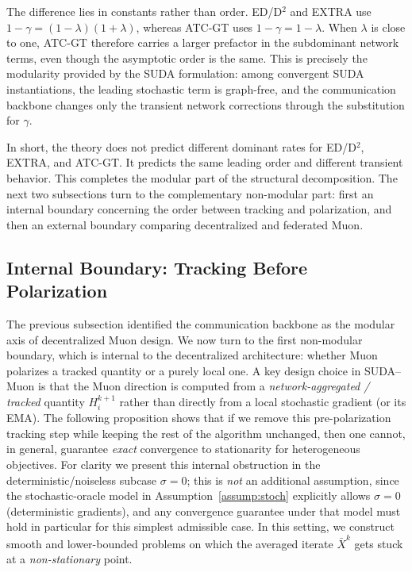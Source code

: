 \documentclass{article}
\newcommand{\sudamuon}{SUDA--Muon}
\begin{document}
The difference lies in constants rather than order. ED/D$^2$ and EXTRA use
$1-\gamma=(1-\lambda)(1+\lambda)$, whereas ATC-GT uses $1-\gamma=1-\lambda$.
When $\lambda$ is close to one, ATC-GT therefore carries a larger prefactor
in the subdominant network terms, even though the asymptotic order is the
same. This is precisely the modularity provided by the SUDA formulation:
among convergent SUDA instantiations, the leading stochastic term is graph-free,
and the communication backbone changes only the transient network corrections
through the substitution for $\gamma$.



In short, the theory does not predict different dominant rates for ED/D$^2$,
EXTRA, and ATC-GT. It predicts the same leading order and different transient
behavior. This completes the modular part of the structural decomposition. The
next two subsections turn to the complementary non-modular part: first an
internal boundary concerning the order between tracking and polarization, and
then an external boundary comparing decentralized and federated Muon.



\subsection{Internal Boundary: Tracking Before Polarization}\label{sec:necessity}

The previous subsection identified the communication backbone as the modular
axis of decentralized Muon design. We now turn to the first non-modular
boundary, which is internal to the decentralized architecture: whether Muon
polarizes a tracked quantity or a purely local one. A key design choice in \sudamuon{} is that the Muon direction is computed from a
\emph{network-aggregated / tracked} quantity $H_i^{k+1}$ rather than directly from a
local stochastic gradient (or its EMA). The following proposition shows that if we
remove this pre-polarization tracking step while keeping the rest of the algorithm
unchanged, then one cannot, in general, guarantee \emph{exact} convergence to
stationarity for heterogeneous objectives. For clarity we present this internal obstruction in
the deterministic/noiseless subcase $\sigma=0$; this is \emph{not} an additional
assumption, since the stochastic-oracle model in Assumption~\ref{assump:stoch}
explicitly allows $\sigma=0$ (deterministic gradients), and any convergence guarantee
under that model must hold in particular for this simplest admissible case. In this
setting, we construct smooth and lower-bounded problems on which the averaged iterate
$\bar X^k$ gets stuck at a \emph{non-stationary} point.
\end{document}
